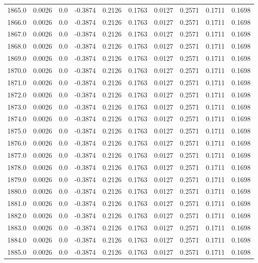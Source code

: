 \begin{longtable}{lrrrrrrrrr}
1865.0 & 0.0026 & 0.0 & -0.3874 & 0.2126 & 0.1763 & 0.0127 & 0.2571 & 0.1711 & 0.1698 \\
1866.0 & 0.0026 & 0.0 & -0.3874 & 0.2126 & 0.1763 & 0.0127 & 0.2571 & 0.1711 & 0.1698 \\
1867.0 & 0.0026 & 0.0 & -0.3874 & 0.2126 & 0.1763 & 0.0127 & 0.2571 & 0.1711 & 0.1698 \\
1868.0 & 0.0026 & 0.0 & -0.3874 & 0.2126 & 0.1763 & 0.0127 & 0.2571 & 0.1711 & 0.1698 \\
1869.0 & 0.0026 & 0.0 & -0.3874 & 0.2126 & 0.1763 & 0.0127 & 0.2571 & 0.1711 & 0.1698 \\
1870.0 & 0.0026 & 0.0 & -0.3874 & 0.2126 & 0.1763 & 0.0127 & 0.2571 & 0.1711 & 0.1698 \\
1871.0 & 0.0026 & 0.0 & -0.3874 & 0.2126 & 0.1763 & 0.0127 & 0.2571 & 0.1711 & 0.1698 \\
1872.0 & 0.0026 & 0.0 & -0.3874 & 0.2126 & 0.1763 & 0.0127 & 0.2571 & 0.1711 & 0.1698 \\
1873.0 & 0.0026 & 0.0 & -0.3874 & 0.2126 & 0.1763 & 0.0127 & 0.2571 & 0.1711 & 0.1698 \\
1874.0 & 0.0026 & 0.0 & -0.3874 & 0.2126 & 0.1763 & 0.0127 & 0.2571 & 0.1711 & 0.1698 \\
1875.0 & 0.0026 & 0.0 & -0.3874 & 0.2126 & 0.1763 & 0.0127 & 0.2571 & 0.1711 & 0.1698 \\
1876.0 & 0.0026 & 0.0 & -0.3874 & 0.2126 & 0.1763 & 0.0127 & 0.2571 & 0.1711 & 0.1698 \\
1877.0 & 0.0026 & 0.0 & -0.3874 & 0.2126 & 0.1763 & 0.0127 & 0.2571 & 0.1711 & 0.1698 \\
1878.0 & 0.0026 & 0.0 & -0.3874 & 0.2126 & 0.1763 & 0.0127 & 0.2571 & 0.1711 & 0.1698 \\
1879.0 & 0.0026 & 0.0 & -0.3874 & 0.2126 & 0.1763 & 0.0127 & 0.2571 & 0.1711 & 0.1698 \\
1880.0 & 0.0026 & 0.0 & -0.3874 & 0.2126 & 0.1763 & 0.0127 & 0.2571 & 0.1711 & 0.1698 \\
1881.0 & 0.0026 & 0.0 & -0.3874 & 0.2126 & 0.1763 & 0.0127 & 0.2571 & 0.1711 & 0.1698 \\
1882.0 & 0.0026 & 0.0 & -0.3874 & 0.2126 & 0.1763 & 0.0127 & 0.2571 & 0.1711 & 0.1698 \\
1883.0 & 0.0026 & 0.0 & -0.3874 & 0.2126 & 0.1763 & 0.0127 & 0.2571 & 0.1711 & 0.1698 \\
1884.0 & 0.0026 & 0.0 & -0.3874 & 0.2126 & 0.1763 & 0.0127 & 0.2571 & 0.1711 & 0.1698 \\
1885.0 & 0.0026 & 0.0 & -0.3874 & 0.2126 & 0.1763 & 0.0127 & 0.2571 & 0.1711 & 0.1698 \\

\end{longtable}
